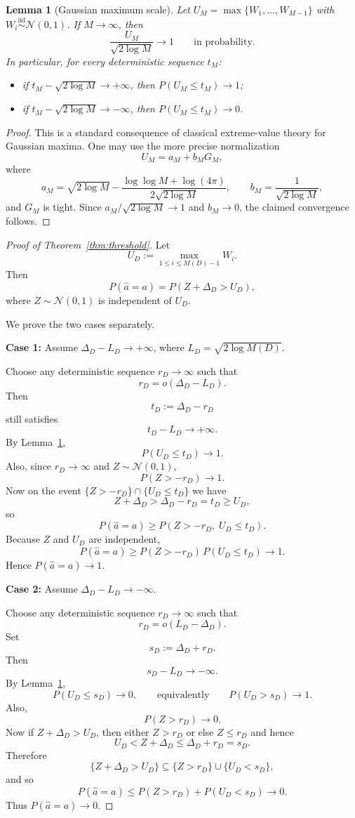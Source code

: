 \documentclass[11pt]{article}
\newtheorem{lemma}[theorem]{Lemma}
\begin{document}
\begin{lemma}[Gaussian maximum scale]\label{lem:max}
Let $U_M = \max\{W_1,\dots,W_{M-1}\}$ with $W_i\stackrel{\mathrm{iid}}{\sim}\mathcal N(0,1)$. If $M\to\infty$, then
\[
\frac{U_M}{\sqrt{2\log M}} \to 1
\qquad\text{in probability.}
\]
In particular, for every deterministic sequence $t_M$:
\begin{itemize}
    \item if $t_M - \sqrt{2\log M}\to +\infty$, then $P(U_M \le t_M)\to 1$;
    \item if $t_M - \sqrt{2\log M}\to -\infty$, then $P(U_M \le t_M)\to 0$.
\end{itemize}
\end{lemma}

\begin{proof}
This is a standard consequence of classical extreme-value theory for Gaussian maxima. One may use the more precise normalization
\[
U_M = a_M + b_M G_M,
\]
where
\[
a_M = \sqrt{2\log M} - \frac{\log\log M + \log(4\pi)}{2\sqrt{2\log M}},
\qquad
b_M = \frac{1}{\sqrt{2\log M}},
\]
and $G_M$ is tight. Since $a_M/\sqrt{2\log M}\to 1$ and $b_M\to 0$, the claimed convergence follows.
\end{proof}

\begin{proof}[Proof of Theorem~\ref{thm:threshold}]
Let
\[
U_D := \max_{1\le i\le M(D)-1} W_i.
\]
Then
\[
P(\hat a = a) = P(Z + \Delta_D > U_D),
\]
where $Z\sim\mathcal N(0,1)$ is independent of $U_D$.

We prove the two cases separately.

\medskip
\noindent\textbf{Case 1:} Assume $\Delta_D - L_D \to +\infty$, where $L_D=\sqrt{2\log M(D)}$.

Choose any deterministic sequence $r_D\to\infty$ such that
\[
r_D = o(\Delta_D - L_D).
\]
Then
\[
t_D := \Delta_D - r_D
\]
still satisfies
\[
t_D - L_D \to +\infty.
\]
By Lemma~\ref{lem:max},
\[
P(U_D \le t_D)\to 1.
\]
Also, since $r_D\to\infty$ and $Z\sim\mathcal N(0,1)$,
\[
P(Z > -r_D)\to 1.
\]
Now on the event $\{Z>-r_D\}\cap\{U_D\le t_D\}$ we have
\[
Z+\Delta_D > \Delta_D-r_D = t_D \ge U_D,
\]
so
\[
P(\hat a=a)
\ge
P(Z>-r_D,\; U_D\le t_D).
\]
Because $Z$ and $U_D$ are independent,
\[
P(\hat a=a)
\ge
P(Z>-r_D)\,P(U_D\le t_D)\to 1.
\]
Hence $P(\hat a=a)\to 1$.

\medskip
\noindent\textbf{Case 2:} Assume $\Delta_D - L_D \to -\infty$.

Choose any deterministic sequence $r_D\to\infty$ such that
\[
r_D = o(L_D-\Delta_D).
\]
Set
\[
s_D := \Delta_D + r_D.
\]
Then
\[
s_D - L_D \to -\infty.
\]
By Lemma~\ref{lem:max},
\[
P(U_D \le s_D)\to 0,
\qquad\text{equivalently}\qquad
P(U_D > s_D)\to 1.
\]
Also,
\[
P(Z > r_D)\to 0.
\]
Now if $Z+\Delta_D > U_D$, then either $Z>r_D$ or else $Z\le r_D$ and hence
\[
U_D < Z+\Delta_D \le \Delta_D + r_D = s_D.
\]
Therefore
\[
\{Z+\Delta_D > U_D\}
\subseteq
\{Z>r_D\}\cup\{U_D < s_D\},
\]
and so
\[
P(\hat a=a)
\le
P(Z>r_D) + P(U_D < s_D)\to 0.
\]
Thus $P(\hat a=a)\to 0$.
\end{proof}
\end{document}

